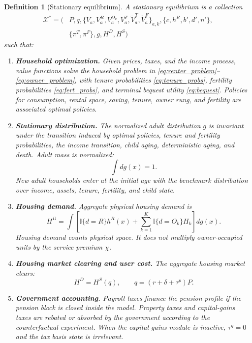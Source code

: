 \documentclass[11pt]{article}
\newtheorem{definition}{Definition}
\newcommand{\ind}{\mathbb{I}}
\begin{document}
\begin{definition}[Stationary equilibrium]
A stationary equilibrium is a collection
\begin{equation*}
\begin{aligned}
\mathcal X^\ast=\big(&P,q,
\{V_a,V^R_a,V^{O_k}_a,V^T_a,\widetilde V^T_a,\widetilde V^F_a\}_{a,k},
\{c,h^R,b',d',n'\},\\
&\{\pi^T,\pi^F\},
g,H^D,H^S
\big)
\end{aligned}
\end{equation*}
such that:
\begin{enumerate}[leftmargin=*]
    \item \textbf{Household optimization.} Given prices, taxes, and the income
    process, value functions solve the household problem in
    \eqref{eq:renter_problem}--\eqref{eq:owner_problem}, with tenure probabilities
    \eqref{eq:tenure_probs}, fertility probabilities \eqref{eq:fert_probs}, and
    terminal bequest utility \eqref{eq:bequest}. Policies for consumption, rental
    space, saving, tenure, owner rung, and fertility are associated optimal
    policies.

    \item \textbf{Stationary distribution.} The normalized adult distribution
    $g$ is invariant under the transition induced by optimal policies, tenure
    and fertility probabilities, the income transition, child aging, deterministic
    aging, and death. Adult mass is normalized:
    \begin{equation*}
        \int dg(x)=1.
    \end{equation*}
    New adult households enter at the initial age with the benchmark distribution
    over income, assets, tenure, fertility, and child state.

    \item \textbf{Housing demand.} Aggregate physical housing demand is
    \begin{equation}
    H^D
    =
    \int
    \left[
    \ind\{d=R\}h^R(x)
    +
    \sum_{k=1}^K\ind\{d=O_k\}H_k
    \right]dg(x).
    \label{eq:housing_demand}
    \end{equation}
    Housing demand counts physical space. It does not multiply owner-occupied
    units by the service premium $\chi$.

    \item \textbf{Housing market clearing and user cost.} The aggregate housing
    market clears:
    \begin{equation}
        H^D=H^S(q),
        \qquad
        q=(r+\delta+\tau^p)P.
        \label{eq:market_clearing}
    \end{equation}

    \item \textbf{Government accounting.} Payroll taxes finance the pension
    profile if the pension block is closed inside the model. Property taxes and
    capital-gains taxes are rebated or absorbed by the government according to
    the counterfactual experiment. When the capital-gains module is inactive,
    $\tau^g=0$ and the tax basis state is irrelevant.
\end{enumerate}
\end{definition}
\end{document}
